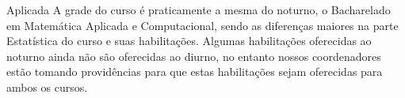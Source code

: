 \begin{subsecao}{Aplicada}
A grade do curso é praticamente a mesma do noturno, o Bacharelado em Matemática
Aplicada e Computacional, sendo as diferenças maiores na parte Estatística do
curso e suas habilitações. Algumas habilitações oferecidas ao noturno ainda não
são oferecidas ao diurno, no entanto nossos coordenadores estão tomando
providências para que estas habilitações sejam oferecidas para ambos os cursos.

\end{subsecao}
